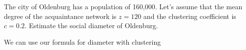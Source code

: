
The city of Oldenburg has a population of 160,000. Let's assume that the mean degree of the acquaintance network is $z=120$ and the clustering coefficient is $c=0.2$. Estimate the social diameter of Oldenburg. 

\solution
We can use our formula for diameter with clustering
